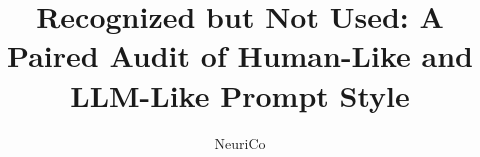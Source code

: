 \documentclass{article}
\title{Recognized but Not Used: A Paired Audit of Human-Like and LLM-Like Prompt Style}
\author{NeuriCo}
\begin{document}
\maketitle

\begin{abstract}

\end{abstract}










\appendix

\end{document}
